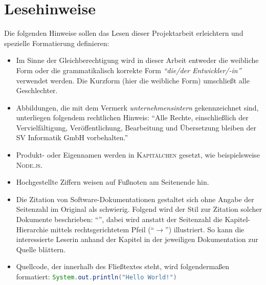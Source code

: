 \chapter*{Lesehinweise}
Die folgenden Hinweise sollen das Lesen dieser Projektarbeit erleichtern und spezielle Formatierung definieren:

\begin{itemize}
	\item Im Sinne der Gleichberechtigung wird in dieser Arbeit entweder die weibliche Form oder die grammatikalisch korrekte Form \textit{\enquote{die/der Entwickler/-in}} verwendet werden. Die Kurzform (hier die weibliche Form) umschließt alle Geschlechter.
	\item Abbildungen, die mit dem Vermerk \textit{unternehmensintern} gekennzeichnet sind, unterliegen folgendem rechtlichen Hinweis: \enquote{Alle Rechte, einschließlich der Vervielfältigung, Veröffentlichung, Bearbeitung und Übersetzung bleiben der SV Informatik GmbH vorbehalten.}
	\item Produkt- oder Eigennamen werden in \textsc{Kapitälchen} gesetzt, wie beispielsweise \textsc{Node.js}.
	\item Hochgestellte Ziffern weisen auf Fußnoten am Seitenende hin.
	\item Die Zitation von Software-Dokumentationen gestaltet sich ohne Angabe der Seitenzahl im Original als schwierig. Folgend wird der Stil zur Zitation solcher Dokumente beschrieben: \enquote{\cite[vgl.][Application\,$\rightarrow$\,Deployments]{red_hat_inc_okd_2019}}, dabei wird anstatt der Seitenzahl die Kapitel-Hierarchie mittels rechtsgerichtetem Pfeil (\enquote{$\rightarrow$}) illustriert. So kann die interessierte Leserin anhand der Kapitel in der jeweiligen Dokumentation zur Quelle blättern.
	\item Quellcode, der innerhalb des Fließtextes steht, wird folgendermaßen formatiert: \lstinline[language=Java]|System.out.println("Hello World!")|
	
	
\end{itemize}
 